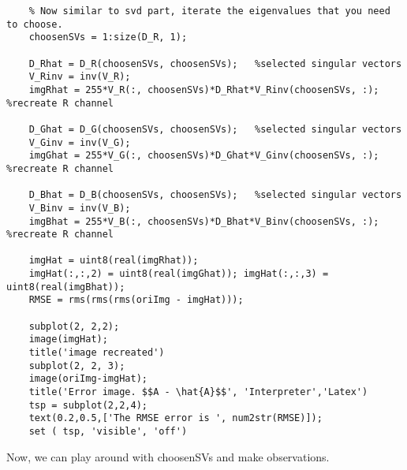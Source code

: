 \documentclass{article}
\begin{document}
  \begin{lstlisting}
    % Now similar to svd part, iterate the eigenvalues that you need to choose.
    choosenSVs = 1:size(D_R, 1);

    D_Rhat = D_R(choosenSVs, choosenSVs);   %selected singular vectors
    V_Rinv = inv(V_R);
    imgRhat = 255*V_R(:, choosenSVs)*D_Rhat*V_Rinv(choosenSVs, :); %recreate R channel

    D_Ghat = D_G(choosenSVs, choosenSVs);   %selected singular vectors
    V_Ginv = inv(V_G);
    imgGhat = 255*V_G(:, choosenSVs)*D_Ghat*V_Ginv(choosenSVs, :); %recreate R channel

    D_Bhat = D_B(choosenSVs, choosenSVs);   %selected singular vectors
    V_Binv = inv(V_B);
    imgBhat = 255*V_B(:, choosenSVs)*D_Bhat*V_Binv(choosenSVs, :); %recreate R channel

    imgHat = uint8(real(imgRhat));
    imgHat(:,:,2) = uint8(real(imgGhat)); imgHat(:,:,3) = uint8(real(imgBhat));
    RMSE = rms(rms(rms(oriImg - imgHat)));

    subplot(2, 2,2);
    image(imgHat);
    title('image recreated')
    subplot(2, 2, 3);
    image(oriImg-imgHat);
    title('Error image. $$A - \hat{A}$$', 'Interpreter','Latex')
    tsp = subplot(2,2,4);
    text(0.2,0.5,['The RMSE error is ', num2str(RMSE)]);
    set ( tsp, 'visible', 'off')
  \end{lstlisting}
  Now, we can play around with choosenSVs and make observations.\\
\end{document}
